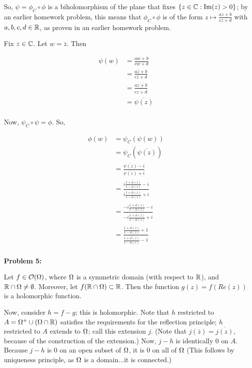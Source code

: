 \documentclass[a4paper,12pt]{article}
\begin{document}
So, $\psi = \phi_C \circ \phi$ is a biholomorphism of the plane that fixes $\{z\in \mathbb{C}:\text{Im}(z)>0\}$; by an earlier homework problem, this means that $\phi_C \circ \phi$ is of the form $z \mapsto \frac{az+b}{cz+d}$ with $a,b,c,d \in \mathbb{R}$, as proven in an earlier homework problem.

Fix $z \in \mathbb{C}$. Let $w = \overline{z}$. Then

\begin{align*}
\psi(w) &= \frac{aw+b}{cw+d}\\
&= \frac{a\overline{z}+b}{c\overline{z}+d}\\
&= \frac{\overline{az+b}}{\overline{cz+d}}\\
&= \overline{\psi(z)}\\
\end{align*}

Now, $\psi_C \circ \psi = \phi$. So,

\begin{align*}
\phi(w) &= \psi_C(\psi(w))\\
&= \psi_C(\overline{\psi(z)})\\
&= \frac{\overline{\psi(z)}-i}{\overline{\psi(z)}+i}\\
&= \frac{\overline{i\frac{1+\phi(z)}{1-\phi(z)}}-i}{\overline{i\frac{1+\phi(z)}{1-\phi(z)}}+i}\\
&= \frac{-i\overline{\frac{1+\phi(z)}{1-\phi(z)}}-i}{-i\overline{\frac{1+\phi(z)}{1-\phi(z)}}+i}\\
&= \frac{\overline{\frac{1+\phi(z)}{1-\phi(z)}}+1}{\overline{\frac{1+\phi(z)}{1-\phi(z)}}-1}\\
\end{align*}


\shunt

{\bf Problem 5:}

Let $f \in \mathcal{O}(\Omega)$, where $\Omega$ is a symmetric domain (with respect to $\mathbb{R}$), and $\mathbb{R} \cap \Omega \neq \emptyset$. Moreover, let $f(\mathbb{R} \cap \Omega) \subset \mathbb{R}$. Then the function $g(z)=f(Re(z))$ is a holomorphic function. %

Now, consider $h=f-g$; this is holomorphic. Note that $h$ restricted to $A=\Omega^+ \cup (\Omega \cap \mathbb{R})$ satisfies the requirements for the reflection principle; $h$ restricted to $A$ extends to $\Omega$; call this extension $j$. (Note that $j(\overline{z}) = \overline{j(z)}$, because of the construction of the extension.) Now, $j-h$ is identically $0$ on $A$. Because $j-h$ is $0$ on an open subset of $\Omega$, it is $0$ on all of $\Omega$ (This follows by uniqueness principle, as $\Omega$ is a domain...it is connected.)
\end{document}
